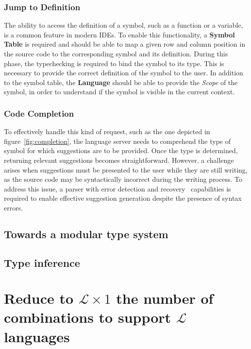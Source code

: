 \subsubsection{Jump to Definition}\label{subsubsec:concept:JumpToDefinition}
The ability to access the definition of a symbol, such as a function or a variable, is a common feature in modern IDEs.
To enable this functionality, a \textbf{Symbol Table} is required and should be able to map a given row and column position in the source code to the corresponding symbol and its definition.
During this phase, the typechecking is required to bind the symbol to its type. This is necessary to provide the correct definition of the symbol to the user.
In addition to the symbol table, the \textbf{Language} should be able to provide the \textit{Scope} of the symbol, in order to understand if the symbol is visible in the current context.

\subsubsection{Code Completion}\label{subsubsec:concept:CodeCompletion}

To effectively handle this kind of request, such as the one depicted in figure~\ref{fig:completion}, the language server needs to comprehend the type of symbol for which suggestions are to be provided. Once the type is determined, returning relevant suggestions becomes straightforward. However, a challenge arises when suggestions must be presented to the user while they are still writing, as the source code may be syntactically incorrect during the writing process. To address this issue, a parser with error detection and recovery~\cite{Graham79} capabilities is required to enable effective suggestion generation despite the presence of syntax errors.

\subsection{Towards a modular type system}\label{sec:concept:TowardsAModularTypeSystem}



\subsection{Type inference}\label{sec:concept:type-inference}

\section{Reduce to $\mathcal{L} \times 1$ the number of combinations to support $\mathcal{L}$ languages}


